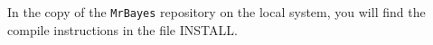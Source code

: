 \documentclass[12pt]{book}
\newcommand{\ttt}[1]{\texttt{#1} }
\begin{document}
In the copy of the \ttt{MrBayes} repository on the local system, you will find the compile
instructions in the file INSTALL.
% 
% 
% 
% 
% 
% 
% 
% 
% 
\end{document}

